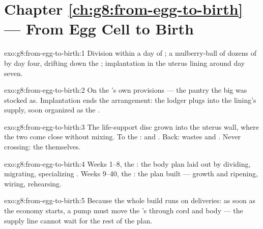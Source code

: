 \section*{Chapter \ref{ch:g8:from-egg-to-birth} --- From Egg Cell to Birth}

\begin{solution}{exo:g8:from-egg-to-birth:1}
Division within a day of ; a mulberry-ball of
dozens of  by day four, drifting down the ;
implantation in the uterus lining around day seven.
\end{solution}

\begin{solution}{exo:g8:from-egg-to-birth:2}
On the 's own provisions --- the pantry the big
 was stocked as. Implantation ends the arrangement:
the lodger plugs into the lining's supply, soon organized
as the .
\end{solution}

\begin{solution}{exo:g8:from-egg-to-birth:3}
The life-support disc grown into the uterus wall, where
the two  come close without mixing. To the :
 and . Back: wastes and .
Never crossing: the  themselves.
\end{solution}

\begin{solution}{exo:g8:from-egg-to-birth:4}
Weeks 1--8, the : the body plan laid out by
dividing, migrating, specializing . Weeks 9--40, the
: the plan built --- growth and ripening, 
wiring,  rehearsing.
\end{solution}

\begin{solution}{exo:g8:from-egg-to-birth:5}
Because the whole build runs on deliveries: as soon as the
 economy starts, a pump must move the 's
 through cord and body --- the supply line cannot
wait for the rest of the plan.
\end{solution}


